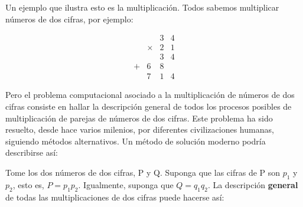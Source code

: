 Un ejemplo que ilustra esto es la multiplicación. Todos sabemos multiplicar
números de dos cifras, por ejemplo:

\[
\begin{array}{cccc}
\  & \  & 3 & 4\\
\  & \times & 2 & 1\\
\hline \  & \  & 3 & 4\\
+ & 6 & 8 & \ \\
\hline \  & 7 & 1 & 4
\end{array}
\]

Pero el problema computacional asociado a la multiplicación de números
de dos cifras consiste en hallar la descripción general de todos los
procesos posibles de multiplicación de parejas de números de dos cifras.
Este problema ha sido resuelto, desde hace varios milenios, por diferentes
civilizaciones humanas, siguiendo métodos alternativos. Un método
de solución moderno podría describirse así:

Tome los dos números de dos cifras, P y Q. Suponga que las cifras
de P son $p_{1}$ y $p_{2}$, esto es, $P=p_{1}p_{2}$. Igualmente,
suponga que $Q=q_{1}q_{2}$. La descripción \textbf{general} de todas
las multiplicaciones de dos cifras puede hacerse así:

